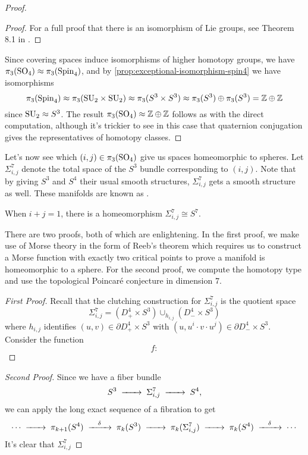 \begin{proof}
\begin{proof}
	For a full proof that there is an isomorphism of Lie groups, see Theorem 8.1 in \cite{lawson1989spin}.
\end{proof}
Since covering spaces induce isomorphisms of higher homotopy groups, we have $\pi_3({\operatorname{SO}}_4)\approx \pi_3({\operatorname{Spin}}_4)$, and by \cref{prop:exceptional-isomorphism-spin4} we have isomorphisms 
\[\pi_3({\operatorname{Spin}}_4)\approx \pi_3({\operatorname{SU}}_2\times {\operatorname{SU}}_2) \approx \pi_3(S^3\times S^3)\approx \pi_3(S^3)\oplus \pi_3(S^3) = \mathbb{Z}\oplus \mathbb{Z}\]
since ${\operatorname{SU}}_2\approx S^3$. The result $\pi_3({\operatorname{SO}}_4)\approx \mathbb{Z}\oplus \mathbb{Z}$ follows as with the direct computation, although it's trickier to see in this case that quaternion conjugation gives the representatives of homotopy classes.
\end{proof}

Let's now see which $(i,j)\in \pi_3({\operatorname{SO}}_4)$ give us spaces homeomorphic to spheres. Let $\Sigma_{i,j}^7$ denote the total space of the $S^3$ bundle corresponding to $(i,j)$. Note that by giving $S^3$ and $S^4$ their usual smooth structures, $\Sigma_{i,j}^7$ gets a smooth structure as well. These manifolds are known as .

\begin{proposition}
	When $i+j=1$, there is a homeomorphism $\Sigma_{i,j}^7\cong S^7$.
\end{proposition}

There are two proofs, both of which are enlightening. In the first proof, we make use of Morse theory in the form of Reeb's theorem which requires us to construct a Morse function with exactly two critical points to prove a manifold is homeomorphic to a sphere. For the second proof, we compute the homotopy type and use the topological Poincar\'e conjecture in dimension $7$.

\begin{proof}[First Proof]
	Recall that the clutching construction for $\Sigma_{i,j}^7$ is the quotient space
	\[
		\Sigma_{i,j}^7 = (D^4_+\times S^3)\cup_{h_{i,j}} (D^4_-\times S^3)
	\]
	where $h_{i,j}$ identifies $(u,v)\in\partial D^4_+ \times S^3$ with $(u, u^i\cdot v\cdot u^j)\in \partial D^4_-\times S^3$.
	Consider the function
	\[
		f : 
	\]
\end{proof}

\begin{proof}[Second Proof]
Since we have a fiber bundle
\[
		S^3 \lkxto \Sigma_{i,j}^7 \lkxto S^4,
\]
we can apply the long exact sequence of a fibration to get 
\[
	\cdots \lkxto \pi_{k+1}(S^{4}) \lkxto[\delta] \pi_k(S^{3}) \lkxto \pi_k(\Sigma_{i,j}^7) \lkxto \pi_{k}(S^{4})\lkxto[\delta] \cdots
\]
It's clear that $\Sigma_{i,j}^7$
\end{proof}





